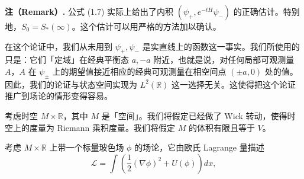 \textbf{注（Remark）.}
公式 (1.7) 实际上给出了内积 $(\psi_+,e^{-tH}\psi_-)$ 的正确估计。特别地，$S_0=S_*(\infty)$。这个估计可以用严格的方法加以确认。

在这个论证中，我们从未用到 $\psi_+,\psi_-$ 是实直线上的函数这一事实。我们所使用的只是：它们「定域」在经典平衡态 $a,-a$ 附近，也就是说，对任何局部可观测量 $A$，$A$ 在 $\psi_\pm$ 上的期望值接近相应的经典可观测量在相空间点 $(\pm a,0)$ 处的值。因此，我们的论证与状态空间实现为 $L^2(\mathbb{R})$ 这一选择无关。这使得把这个论证推广到场论的情形变得容易。

考虑时空 $M\times\mathbb{R}$，其中 $M$ 是「空间」。我们将假定已经做了 Wick 转动，使得时空上的度量为 Riemann 乘积度量。我们将假定 $M$ 的体积有限且等于 $V$。

考虑 $M\times\mathbb{R}$ 上带一个标量玻色场 $\phi$ 的场论，它由欧氏 Lagrange 量描述
\begin{equation}
  \tag{1.8}
  \label{eq:1-8}
  \mathcal{L}=\int\left(\frac12(\nabla\phi)^2+U(\phi)\right)dx,
\end{equation}
